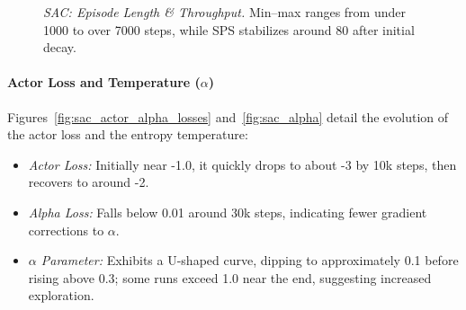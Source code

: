\begin{figure}
	\centering
	\quad
	\caption{\emph{SAC: Episode Length \& Throughput.} Min–max ranges from under 1000 to over 7000 steps, while SPS stabilizes around 80 after initial decay.}
	\label{fig:sac_epilen_sps}
\end{figure}

\paragraph{Actor Loss and Temperature ($\alpha$)}
Figures~\ref{fig:sac_actor_alpha_losses} and~\ref{fig:sac_alpha} detail the evolution of the actor loss and the entropy temperature:
\begin{itemize}
	\item \emph{Actor Loss:} Initially near -1.0, it quickly drops to about -3 by 10k steps, then recovers to around -2.
	\item \emph{Alpha Loss:} Falls below 0.01 around 30k steps, indicating fewer gradient corrections to $\alpha$.
	\item \emph{$\alpha$ Parameter:} Exhibits a U-shaped curve, dipping to approximately 0.1 before rising above 0.3; some runs exceed 1.0 near the end, suggesting increased exploration.
\end{itemize}

